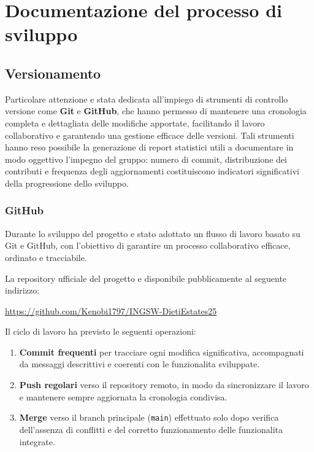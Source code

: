 \documentclass[a4paper,11pt]{article}
\begin{document}
\section{Documentazione del processo di sviluppo}

\subsection{Versionamento}

Particolare attenzione e stata dedicata all'impiego di strumenti di controllo versione come \textbf{Git} e \textbf{GitHub}, che hanno permesso di mantenere una cronologia completa e dettagliata delle modifiche apportate, facilitando il lavoro collaborativo e garantendo una gestione efficace delle versioni. Tali strumenti hanno reso possibile la generazione di report statistici utili a documentare in modo oggettivo l'impegno del gruppo: numero di commit, distribuzione dei contributi e frequenza degli aggiornamenti costituiscono indicatori significativi della progressione dello sviluppo.

\subsubsection{GitHub}

Durante lo sviluppo del progetto e stato adottato un flusso di lavoro basato su Git e GitHub, con l'obiettivo di garantire un processo collaborativo efficace, ordinato e tracciabile.

La repository ufficiale del progetto e disponibile pubblicamente al seguente indirizzo:

\begin{center}
  \url{https://github.com/Kenobi1797/INGSW-DietiEstates25}
\end{center}

Il ciclo di lavoro ha previsto le seguenti operazioni:
\begin{enumerate}
  \item \textbf{Commit frequenti} per tracciare ogni modifica significativa, accompagnati da messaggi descrittivi e coerenti con le funzionalita sviluppate.
  \item \textbf{Push regolari} verso il repository remoto, in modo da sincronizzare il lavoro e mantenere sempre aggiornata la cronologia condivisa.
  \item \textbf{Merge} verso il branch principale (\texttt{main}) effettuato solo dopo verifica dell'assenza di conflitti e del corretto funzionamento delle funzionalita integrate.
\end{enumerate}
\end{document}

